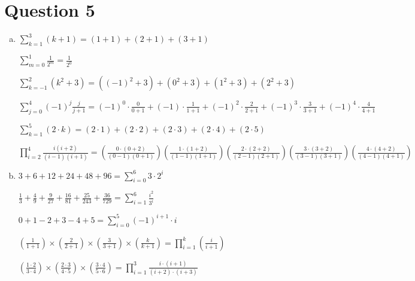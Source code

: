 \documentclass[12pt]{article}
\begin{document}
\section*{Question 5}
\begin{enumerate}[a.]

    \item

    $\sum\limits_{k=1}^3 (k+1) = (1 + 1) + (2 + 1) + (3 + 1)$

    $\sum\limits_{m=0}^1 \frac{1}{2^m} = \frac{1}{2^0}$

    $\sum\limits_{k=-1}^2 (k^2 + 3) = ((-1)^2 + 3) + (0^2 + 3) + (1^2 + 3) + (2^2 + 3)$

    $\sum\limits_{j=0}^4 (-1)^j \frac{j}{j + 1} = (-1)^0 \cdot \frac{0}{0 + 1} +
    (-1) \cdot \frac{1}{1 + 1} + (-1)^2 \cdot \frac{2}{2 + 1} + (-1)^3 \cdot \frac{3}{3 + 1} +
    (-1)^4 \cdot \frac{4}{4 + 1}$

    $\sum\limits_{k=1}^5 (2 \cdot k) = (2 \cdot 1) + (2 \cdot 2) + (2 \cdot 3) +
    (2 \cdot 4) + (2 \cdot 5)$

    $\prod\limits_{i=2}^4 \frac{i(i+2)}{(i-1)(i+1)} = \left( \frac{0 \cdot (0+2)}{(0-1)(0+1)} \right)
    \left( \frac{1 \cdot (1+2)}{(1-1)(1+1)} \right) \left( \frac{2 \cdot (2+2)}{(2-1)(2+1)} \right)
    \left( \frac{3 \cdot (3+2)}{(3-1)(3+1)} \right) \left( \frac{4 \cdot (4+2)}{(4-1)(4+1)} \right)$

    \item

    $3+6+12+24+48+96 = \sum\limits_{i=0}^6 3 \cdot 2^i$

    $\frac{1}{3} + \frac{4}{9} + \frac{9}{27} + \frac{16}{81} + \frac{25}{243} + \frac{36}{729} = \sum\limits_{i=1}^6 \frac{i^2}{3^i}$

    $0 + 1 - 2 + 3 - 4 + 5 = \sum\limits_{i=0}^5 (-1)^{i+1} \cdot i$

    $\left( \frac{1}{1 + 1} \right) \times \left( \frac{2}{2 + 1} \right) \times
    \left( \frac{3}{3 + 1} \right) \times \left( \frac{k}{k + 1} \right) = \prod\limits_{i=1}^k \left( \frac{i}{i + 1} \right)$

    $\left( \frac{1 \cdot 2}{3 \cdot 4} \right) \times \left( \frac{2 \cdot 3}{4 \cdot 5} \right)
    \times \left( \frac{3 \cdot 4}{5 \cdot 6} \right) = \prod\limits_{i=1}^3 \frac{i \cdot (i+1)}{(i+2) \cdot (i+3)}$

\end{enumerate}
\end{document}
